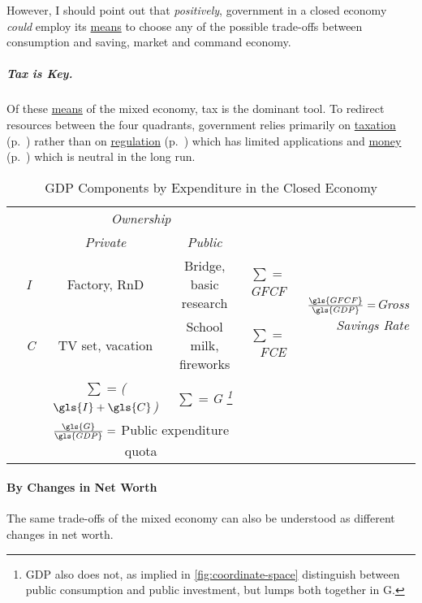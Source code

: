 However, I should point out that \emph{positively}, government in a closed economy \emph{could} employ its \hyperref[sec:means]{means} to choose any of the possible trade-offs between consumption and saving, market and command economy.

\subparagraph[Tax is Key]{Tax is Key.}
Of these \hyperref[sec:means]{means} of the mixed economy, tax is the dominant tool.
To redirect resources between the four quadrants, government relies primarily on \hyperref[sec:fiscal]{taxation} (p.~\pageref{sec:fiscal}) rather than on \hyperref[sec:regulatory]{regulation} (p.~\pageref{sec:regulatory}) which has limited applications and \hyperref[sec:monetary]{money} (p.~\pageref{sec:monetary}) which is neutral in the long run.

\begin{landscape}
\begin{table}
	\caption{GDP Components by Expenditure in the Closed Economy}
	\label{tab:GDP-Comp-Exp}
	\small
	\begin{center}
	\renewcommand{\arraystretch}{1.5}
	\begin{tabular}{llccrr}
		\toprule
		& & \multicolumn{2}{c}{\emph{Ownership}} & &\\
		\cmidrule(r){3-4}
		& &\emph{Private} & \emph{Public}& &\\
		\midrule
		\multirow{2}{*}{\emph{}} & \emph{\gls{I}} & Factory,  \gls{RnD} & Bridge, basic research & \emph{$\sum=$\gls{GFCF}} & \multirow{2}{*}{\emph{$\frac{\gls{GFCF}}{\gls{GDP}}=$Gross Savings Rate}}\\
		& \emph{\gls{C}} & TV set, vacation & School milk, fireworks & \emph{$\sum=$\gls{FCE}}  \\
		\midrule
		& &\emph{$\sum=$($\gls{I}+\gls{C}$)} & \emph{$\sum=$\gls{G}
		\footnote{
			\Gls{GDP} also does not, as implied in \autoref{fig:coordinate-space} distinguish between public consumption and public investment, but lumps both together in \gls{G}.
		}}\\
		\cmidrule(r){3-4}
		& & \multicolumn{2}{c}{$\frac{\gls{G}}{\gls{GDP}}=$ Public expenditure quota} \\
		\bottomrule
	\end{tabular}
	\end{center}
\end{table}
\end{landscape}

\paragraph{By Changes in Net Worth}
	\label{sec:delta-net-worth}
The same trade-offs of the mixed economy can also be understood as different changes in net worth.

